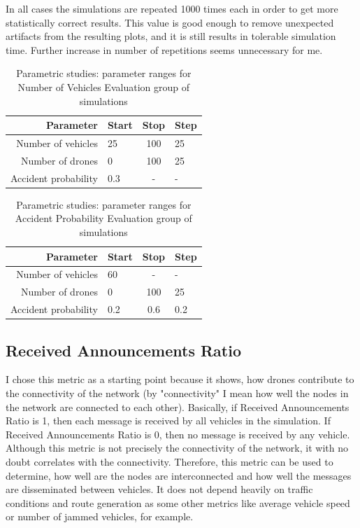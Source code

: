 \documentclass[]{nsm-thesis}
\begin{document}
In all cases the simulations are repeated 1000 times each in order to get more statistically correct results. This value is good enough to remove unexpected artifacts from the resulting plots, and it is still results in tolerable simulation time. Further increase in number of repetitions seems unnecessary for me.

\begin{table}
    \centering
    \begin{tabular}{rlcl}
        \toprule
        Parameter & Start & Stop & Step \\
        \midrule
		Number of vehicles & 25 & 100 & 25 \\
		Number of drones & 0 & 100 & 25 \\
		Accident probability & 0.3 & - & - \\
        \bottomrule
    \end{tabular}
    \caption{Parametric studies: parameter ranges for Number of Vehicles Evaluation group of simulations}
    \label{tab:inputrange1}
\end{table}

\begin{table}
    \centering
    \begin{tabular}{rlcl}
        \toprule
        Parameter & Start & Stop & Step \\
        \midrule
		Number of vehicles & 60 & - & - \\
		Number of drones & 0 & 100 & 25 \\
		Accident probability & 0.2 & 0.6 & 0.2 \\
        \bottomrule
    \end{tabular}
    \caption{Parametric studies: parameter ranges for Accident Probability Evaluation group of simulations}
    \label{tab:inputrange2}
\end{table}



\subsection{Received Announcements Ratio}
\label{sec:ReceivedAnnouncementsRatio}

I chose this metric as a starting point because it shows, how drones contribute to the connectivity of the network (by "connectivity" I mean how well the nodes in the network are connected to each other). Basically, if Received Announcements Ratio is 1, then each message is received by all vehicles in the simulation. If Received Announcements Ratio is 0, then no message is received by any vehicle. Although this metric is not precisely the connectivity of the network, it with no doubt correlates with the connectivity. Therefore, this metric can be used to determine, how well are the nodes are interconnected and how well the messages are disseminated between vehicles. It does not depend heavily on traffic conditions and route generation as some other metrics like average vehicle speed or number of jammed vehicles, for example.
\end{document}
